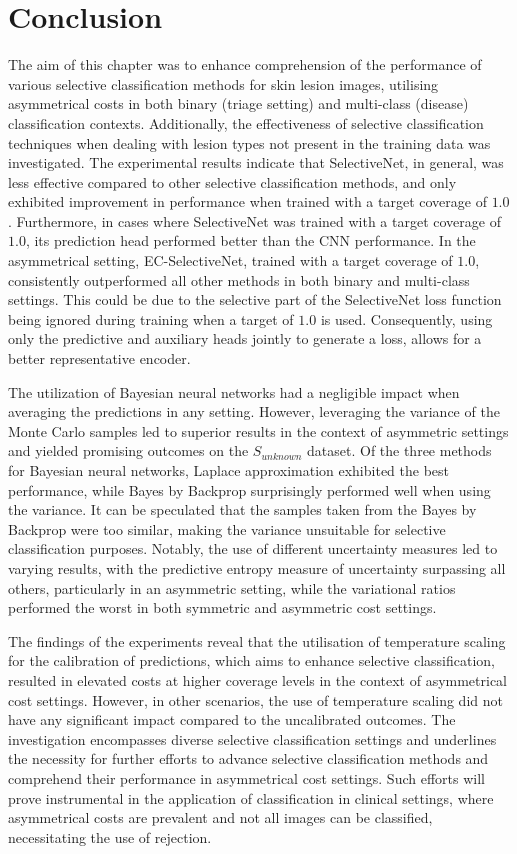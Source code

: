 \section{Conclusion}
\label{sec:selective_conclusion}
The aim of this chapter was to enhance comprehension of the performance of various selective classification methods for skin lesion images, utilising asymmetrical costs in both binary (triage setting) and multi-class (disease) classification contexts. Additionally, the effectiveness of selective classification techniques when dealing with lesion types not present in the training data was investigated. The experimental results indicate that SelectiveNet, in general, was less effective compared to other selective classification methods, and only exhibited improvement in performance when trained with a target coverage of $1.0$. Furthermore, in cases where SelectiveNet was trained with a target coverage of $1.0$, its prediction head performed better than the CNN performance. In the asymmetrical setting, EC-SelectiveNet, trained with a target coverage of $1.0$, consistently outperformed all other methods in both binary and multi-class settings. This could be due to the selective part of the SelectiveNet loss function being ignored during training when a target of $1.0$ is used. Consequently, using only the predictive and auxiliary heads jointly to generate a loss, allows for a better representative encoder.

The utilization of Bayesian neural networks had a negligible impact when averaging the predictions in any setting. However, leveraging the variance of the Monte Carlo samples led to superior results in the context of asymmetric settings and yielded promising outcomes on the $S_{unknown}$ dataset. Of the three methods for Bayesian neural networks, Laplace approximation exhibited the best performance, while Bayes by Backprop surprisingly performed well when using the variance. It can be speculated that the samples taken from the Bayes by Backprop were too similar, making the variance unsuitable for selective classification purposes. Notably, the use of different uncertainty measures led to varying results, with the predictive entropy measure of uncertainty surpassing all others, particularly in an asymmetric setting, while the variational ratios performed the worst in both symmetric and asymmetric cost settings.

The findings of the experiments reveal that the utilisation of temperature scaling for the calibration of predictions, which aims to enhance selective classification, resulted in elevated costs at higher coverage levels in the context of asymmetrical cost settings. However, in other scenarios, the use of temperature scaling did not have any significant impact compared to the uncalibrated outcomes. The investigation encompasses diverse selective classification settings and underlines the necessity for further efforts to advance selective classification methods and comprehend their performance in asymmetrical cost settings. Such efforts will prove instrumental in the application of classification in clinical settings, where asymmetrical costs are prevalent and not all images can be classified, necessitating the use of rejection.